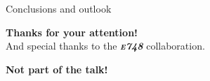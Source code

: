 \documentclass[sans,
frameno, %
mp,
usenames,dvipsnames, %
onlytextwidth, %
t,%
11pt]{beamer}
\newcommand{\iso}[2]{\ce{^{#1}#2}}
\begin{document}
\begin{frame}[c]{Conclusions and outlook}
{\begin{center}
        \end{center}
    }
\end{frame}

\End
\begin{frame}
    \centering
    \textbf{Thanks for your attention!}\\
    And special thanks to the \textbf{\itshape\scshape e748} collaboration.
\end{frame}

\begin{frame}
    \centering
    \textbf{Not part of the talk!}
\end{frame}
\end{document}
